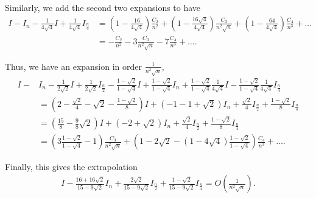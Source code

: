 \documentclass[10pt]{article}
\begin{document}
\begin{enumerate}
    Similarly, we add the second two expansions to have \begin{align*}
        I - I_n - \frac{1}{4\sqrt{4}}I + \frac{1}{4\sqrt{4}}I_{\frac{n}{4}} &= \left( 1 - \frac{16}{4\sqrt{4}} \right) \frac{C_2}{n^2} + \left( 1 - \frac{16\sqrt{4}}{4\sqrt{4}} \right) \frac{C_3}{n^2\sqrt{n}} + \left( 1 - \frac{64}{4\sqrt{4}} \right) \frac{C_4}{n^3} + \dots \\
        &= -\frac{C_2}{n^2} - 3 \frac{C_3}{n^2\sqrt{n}} - 7 \frac{C_4}{n^3} + \dots.
    \end{align*}

    Thus, we have an expansion in order \(\frac{1}{n^2\sqrt{n}}\), \begin{align*}
      I -& I_n - \frac{1}{2\sqrt{2}}I + \frac{1}{2\sqrt{2}}I_{\frac{n}{2}} - \frac{1-\sqrt{2}}{1-\sqrt{4}}I + \frac{1-\sqrt{2}}{1-\sqrt{4}}I_n + \frac{1-\sqrt{2}}{1-\sqrt{4}}\frac{1}{4\sqrt{4}}I - \frac{1-\sqrt{2}}{1-\sqrt{4}}\frac{1}{4\sqrt{4}}I_{\frac{n}{4}} \\
      &= \left(2-\frac{\sqrt{2}}{4} -\sqrt{2} - \frac{1-\sqrt{2}}{8}\right)I + \left(-1 - 1 + \sqrt{2}\right)I_n + \frac{\sqrt{2}}{4}I_{\frac{n}{2}} + \frac{1-\sqrt{2}}{8}I_{\frac{n}{4}} \\
      &= \left(\frac{15}{8}-\frac{9}{8}\sqrt{2}\right)I + \left(-2 + \sqrt{2}\right)I_n + \frac{\sqrt{2}}{4}I_{\frac{n}{2}} + \frac{1-\sqrt{2}}{8}I_{\frac{n}{4}} \\
      &= \left(3 \frac{1-\sqrt{2}}{1-\sqrt{4}}-1\right) \frac{C_3}{n^2\sqrt{n}} + \left( 1 - 2\sqrt{2} - \left(1-4\sqrt{4}\right) \frac{1-\sqrt{2}}{1-\sqrt{4}} \right) \frac{C_4}{n^3} + \dots. 
    \end{align*}

    Finally, this gives the extrapolation \begin{align*}
        I - \frac{16+16\sqrt{2}}{15 - 9\sqrt{2}}I_n + \frac{2\sqrt{2}}{15 - 9\sqrt{2}}I_{\frac{n}{2}} + \frac{1-\sqrt{2}}{15 - 9 \sqrt{2}} I_{\frac{n}{4}} = O(\frac{1}{n^2\sqrt{n}}).
    \end{align*}

\end{enumerate}
\end{document}
